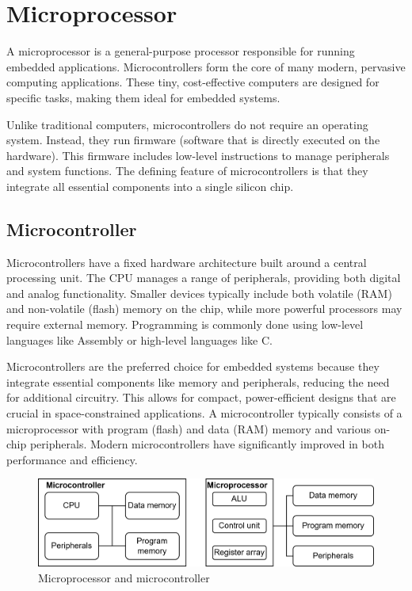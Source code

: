 \section{Microprocessor}

A microprocessor is a general-purpose processor responsible for running embedded applications.
Microcontrollers form the core of many modern, pervasive computing applications. 
These tiny, cost-effective computers are designed for specific tasks, making them ideal for embedded systems.

Unlike traditional computers, microcontrollers do not require an operating system. 
Instead, they run firmware (software that is directly executed on the hardware). 
This firmware includes low-level instructions to manage peripherals and system functions.
The defining feature of microcontrollers is that they integrate all essential components into a single silicon chip.

\subsection{Microcontroller}
Microcontrollers have a fixed hardware architecture built around a central processing unit. 
The CPU manages a range of peripherals, providing both digital and analog functionality.
Smaller devices typically include both volatile (RAM) and non-volatile (flash) memory on the chip, while more powerful processors may require external memory.
Programming is commonly done using low-level languages like Assembly or high-level languages like C.

Microcontrollers are the preferred choice for embedded systems because they integrate essential components like memory and peripherals, reducing the need for additional circuitry. 
This allows for compact, power-efficient designs that are crucial in space-constrained applications.
A microcontroller typically consists of a microprocessor with program (flash) and data (RAM) memory and various on-chip peripherals.
Modern microcontrollers have significantly improved in both performance and efficiency. 

\begin{figure}[H]
    \centering
    \includegraphics[width=0.75\linewidth]{images/eeai5.png}
    \caption{Microprocessor and microcontroller}
\end{figure}

